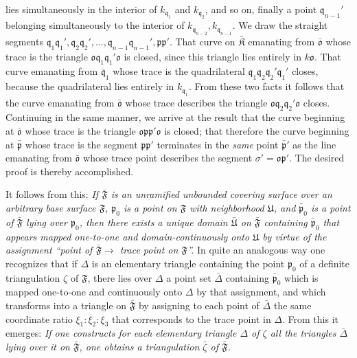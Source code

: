 \documentclass{article}
\begin{document}
lies simultaneously in the interior of $k_{\mathfrak{q}_1}$ and $k_{\mathfrak{q}_2}$, and so on, finally a point $\mathfrak{q}_{n-1}'$ belonging simultaneously to the interior of $k_{\mathfrak{q}_{n-2}}, k_{\mathfrak{q}_{n-1}}$. We draw the straight segments $\mathfrak{q}_1\mathfrak{q}_1', \mathfrak{q}_2\mathfrak{q}_2', \dots, \mathfrak{q}_{n-1}\mathfrak{q}_{n-1}', \mathfrak{p}\mathfrak{p}'$. That curve on $\bar{\mathfrak{K}}$ emanating from $\bar{\mathfrak{o}}$ whose trace is the triangle $\mathfrak{o}\mathfrak{q}_1\mathfrak{q}_1'\mathfrak{o}$ is closed, since this triangle lies entirely in $k\mathfrak{o}$. That curve emanating from $\bar{\mathfrak{q}}_1$ whose trace is the quadrilateral $\mathfrak{q}_1\mathfrak{q}_2\mathfrak{q}_2'\mathfrak{q}_1'$ closes, because the quadrilateral lies entirely in $k_{\mathfrak{q}_1}$. From these two facts it follows that the curve emanating from $\bar{\mathfrak{o}}$ whose trace describes the triangle $\mathfrak{o}\mathfrak{q}_2\mathfrak{q}_2'\mathfrak{o}$ closes. Continuing in the same manner, we arrive at the result that the curve beginning at $\bar{\mathfrak{o}}$ whose trace is the triangle $\mathfrak{o}\mathfrak{p}\mathfrak{p}'\mathfrak{o}$ is closed; that therefore the curve beginning at $\bar{\mathfrak{p}}$ whose trace is the segment $\mathfrak{p}\mathfrak{p}'$ terminates in the \emph{same} point $\bar{\mathfrak{p}}'$ as the line emanating from $\bar{\mathfrak{o}}$ whose trace point describes the segment $\sigma' = \mathfrak{o}\mathfrak{p}'$. The desired proof is thereby accomplished.

It follows from this: \emph{If $\bar{\mathfrak{F}}$ is an unramified unbounded covering surface over an arbitrary base surface $\mathfrak{F}$, $\mathfrak{p}_0$ is a point on $\mathfrak{F}$ with neighborhood $\mathfrak{U}$, and $\bar{\mathfrak{p}}_0$ is a point of $\bar{\mathfrak{F}}$ lying over $\mathfrak{p}_0$, then there exists a unique domain $\bar{\mathfrak{U}}$ on $\bar{\mathfrak{F}}$ containing $\bar{\mathfrak{p}}_0$ that appears mapped one-to-one and domain-continuously onto $\mathfrak{U}$ by virtue of the assignment ``point of $\bar{\mathfrak{F}} \to$ trace point on $\mathfrak{F}$''.} In quite an analogous way one recognizes that if $\Delta$ is an elementary triangle containing the point $\mathfrak{p}_0$ of a definite triangulation $\zeta$ of $\mathfrak{F}$, there lies over $\Delta$ a point set $\bar{\Delta}$ containing $\bar{\mathfrak{p}}_0$ which is mapped one-to-one and continuously onto $\Delta$ by that assignment, and which transforms into a triangle on $\bar{\mathfrak{F}}$ by assigning to each point of $\bar{\Delta}$ the same coordinate ratio $\xi_1 : \xi_2 : \xi_3$ that corresponds to the trace point in $\Delta$. From this it emerges: \emph{If one constructs for each elementary triangle $\Delta$ of $\zeta$ all the triangles $\bar{\Delta}$ lying over it on $\bar{\mathfrak{F}}$, one obtains a triangulation $\bar{\zeta}$ of $\bar{\mathfrak{F}}$.}
\end{document}
